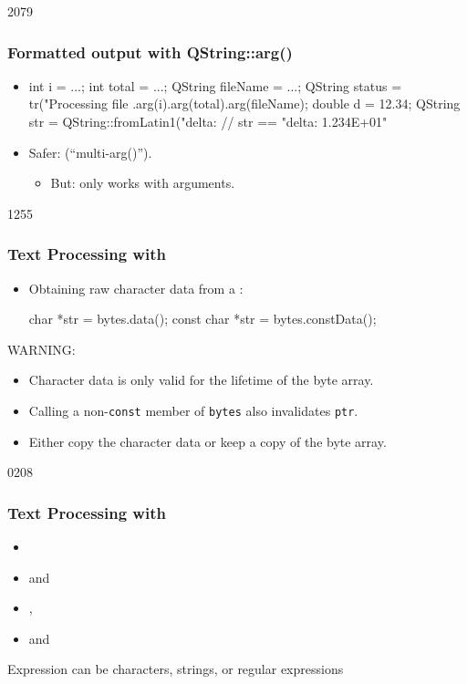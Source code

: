 \begin{slide}[fragile]{2079}
\frametitle{Formatted output with QString::arg()}
\begin{itemize}
\item[]
\begin{cpp}
int i = ...;
int total = ...;
QString fileName = ...;
QString status = tr("Processing file %
                .arg(i).arg(total).arg(fileName);
double d = 12.34;
QString str = QString::fromLatin1("delta: %
// str == "delta: 1.234E+01"               
\end{cpp}\medskip

\item Safer:  (``multi-arg()'').
  \begin{itemize}
  \item But: only works with  arguments.
  \end{itemize}
\end{itemize}
\end{slide}

\begin{slide}[fragile]{1255}\frametitle{Text Processing with }
  \begin{itemize}
  \item Obtaining raw character data from a :
  
  \begin{cpp}
char *str = bytes.data();
const char *str = bytes.constData();
  \end{cpp}
  \end{itemize}\bigskip

WARNING:
  \begin{itemize}  
  \item Character data is only valid for the lifetime of the byte array.
  \item Calling a non-\texttt{const} member of \texttt{bytes} also invalidates \texttt{ptr}.
  \item Either copy the character data or keep a copy of the byte array.
  \end{itemize}
\end{slide}

\begin{slide}{0208}\frametitle{Text Processing with }
    \begin{itemize}
      \item {} 
      \item {} and  
      \item {}, 
      \item {} and  
    \end{itemize}
    Expression can be characters, strings, or regular expressions
\end{slide}

